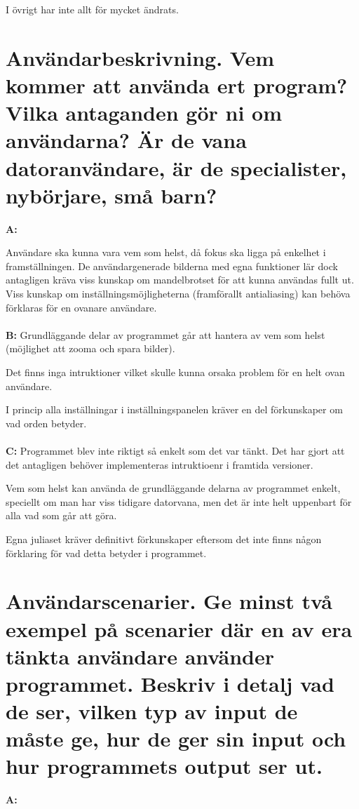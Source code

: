 \documentclass[11pt]{article} %
\begin{document}
I övrigt har inte allt för mycket ändrats.

\section{Användarbeskrivning. Vem kommer att använda ert program? Vilka antaganden gör ni om användarna? Är de vana datoranvändare, är de specialister, nybörjare, små barn?}

{\bf A:}

Användare ska kunna vara vem som helst, då fokus ska ligga på enkelhet i framställningen. De användargenerade bilderna med egna funktioner lär dock antagligen kräva viss kunskap om mandelbrotset för att kunna användas fullt ut. Viss kunskap om inställningsmöjligheterna (framförallt antialiasing) kan behöva förklaras för en ovanare användare.
\\
\\
{\bf B:} 
\noindent Grundläggande delar av programmet går att hantera av vem som helst (möjlighet att zooma och spara bilder). 

\noindent Det finns inga intruktioner vilket skulle kunna orsaka problem för en helt ovan användare.

\noindent I princip alla inställningar i inställningspanelen kräver en del förkunskaper om vad orden betyder.
\\
\\
{\bf C:} Programmet blev inte riktigt så enkelt som det var tänkt. Det har gjort att det antagligen behöver implementeras intruktioenr i framtida versioner.

Vem som helst kan använda de grundläggande delarna av programmet enkelt, speciellt om man har viss tidigare datorvana, men det är inte helt uppenbart för alla vad som går att göra.

Egna juliaset kräver definitivt förkunskaper eftersom det inte finns någon förklaring för vad detta betyder i programmet.

\section{Användarscenarier. Ge minst två exempel på scenarier där en av era tänkta användare använder programmet. Beskriv i detalj vad de ser, vilken typ av input de måste ge, hur de ger sin input och hur programmets output ser ut.}

{\bf A:}
\end{document}

